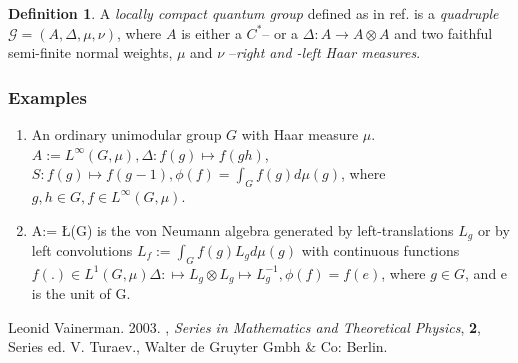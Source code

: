 \documentclass[12pt]{article}
\theoremstyle{plain}
\theoremstyle{definition}
\newtheorem{definition}{Definition}[section]
\numberwithin{equation}{section}
\newcommand{\G}{\mathcal G}
\begin{document}
\begin{definition}
A {\em locally compact quantum group} defined as in ref. \cite{LV2k3} is a \emph{quadruple $\G = (A, \Delta, \mu, \nu)$}, where $A$ is either a $C^*$-- or a 
$\Delta: A \to A \otimes A$ and two faithful semi-finite normal weights, $\mu$ and $\nu$ --{\em right and -left Haar measures}. 
\end{definition}



\subsubsection{Examples}

\begin{enumerate}
\item An ordinary unimodular group $G$ with Haar measure $ \mu$. 
$A := L^{\infty}(G, \mu), \Delta: f(g) \mapsto f(gh)$, 
$S: f(g) \mapsto f(g^{}-1), \phi(f) = \int_G f(g)d\mu (g)$, where  $g, h \in G, f \in L^{\infty}(G, \mu)$.

\item A:= \L (G) is the von Neumann algebra generated by left-translations $L_g$ or by left convolutions 
$L_f :={ \int}_G f(g)L_g d \mu (g)$ with continuous functions $f(.) \in L^1(G,\mu) \Delta: \mapsto L_g \otimes L_g \mapsto L_g^{-1}, \phi(f) = f(e) $, where $g \in G$, and e is the unit of G.
\end{enumerate}


\begin{thebibliography}{9}

Leonid Vainerman. 2003. 
, 
{\em Series in Mathematics and Theoretical Physics}, {\bf 2}, Series ed. V. Turaev., Walter de Gruyter Gmbh \& Co: Berlin.
\end{thebibliography}
\end{document}
